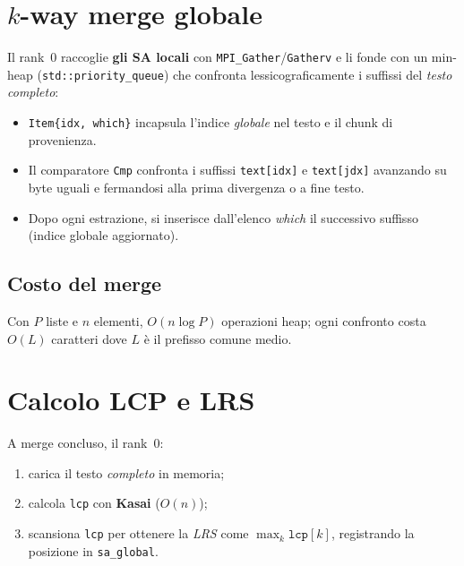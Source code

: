 	\section{$k$-way merge globale}
		Il rank~0 raccoglie \textbf{gli SA locali} con \texttt{MPI\_Gather}/\texttt{Gatherv} e li fonde con un min-heap (\texttt{std::priority\_queue}) che confronta lessicograficamente i suffissi del \emph{testo completo}:
		\begin{itemize}
			\item \texttt{Item\{idx, which\}} incapsula l'indice \emph{globale} nel testo e il chunk di provenienza.
			\item Il comparatore \texttt{Cmp} confronta i suffissi \texttt{text[idx]} e \texttt{text[jdx]} avanzando su byte uguali e fermandosi alla prima divergenza o a fine testo.
			\item Dopo ogni estrazione, si inserisce dall'elenco \emph{which} il successivo suffisso (indice globale aggiornato).
		\end{itemize}
		
		\subsection*{Costo del merge}
			Con $P$ liste e $n$ elementi, \(O(n \log P)\) operazioni heap; ogni confronto costa \(O(L)\) caratteri dove \(L\) è il prefisso comune medio.
	
	\section{Calcolo LCP e LRS}
		A merge concluso, il rank~0:
		\begin{enumerate}
			\item carica il testo \emph{completo} in memoria;
			\item calcola \texttt{lcp} con \textbf{Kasai} (\(O(n)\));
			\item scansiona \texttt{lcp} per ottenere la \emph{LRS} come \(\max_k \texttt{lcp}[k]\), registrando la posizione in \texttt{sa\_global}.
		\end{enumerate}
	
